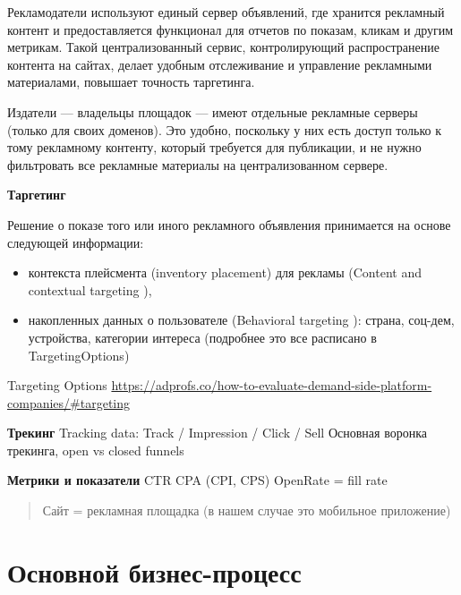 \documentclass[times]{itmo-student-thesis}
\begin{document}
Рекламодатели используют единый сервер объявлений, где хранится рекламный контент и предоставляется функционал для отчетов по показам, кликам и другим метрикам. Такой централизованный сервис, контролирующий распространение контента на сайтах, делает удобным отслеживание и управление рекламными материалами, повышает точность таргетинга.

Издатели — владельцы площадок — имеют отдельные рекламные серверы (только для своих доменов). Это удобно, поскольку у них есть доступ только к тому рекламному контенту, который требуется для публикации, и не нужно фильтровать все рекламные материалы на централизованном сервере.

\textbf{Таргетинг}

Решение о показе того или иного рекламного объявления принимается на основе следующей информации:
\begin{itemize}
	\item контекста плейсмента (inventory placement) для рекламы (Content and contextual targeting \cite{contextual-targeting}),
	\item накопленных данных о пользователе (Behavioral targeting \cite{behavioural-targeting}): страна, соц-дем, устройства, категории интереса (подробнее это все расписано в TargetingOptions) 
\end{itemize}

Targeting Options \url{https://adprofs.co/how-to-evaluate-demand-side-platform-companies/#targeting}

\textbf{Трекинг}
Tracking data: Track / Impression / Click / Sell
Основная воронка трекинга, open vs closed funnels

\textbf{Метрики и показатели}
CTR
CPA (CPI, CPS)
OpenRate = fill rate

\begin{quotation}
  Сайт = рекламная площадка (в нашем случае это мобильное приложение)
\end{quotation}

\section{Основной бизнес-процесс}
\end{document}
